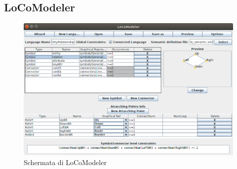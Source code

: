         \newpage

        \subsection{LoCoModeler}
        
            \begin{figure}[htbp]
                \centering
                \includegraphics[scale=1.5]{Figure/locomodeler.png}
                \caption{Schermata di LoCoModeler}
                \label{fig:locomodeler}
            \end{figure}

